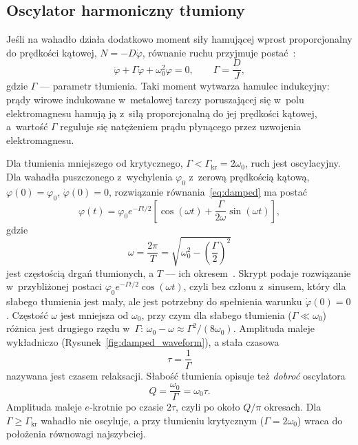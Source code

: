 \documentclass[12pt, a4paper]{article}
\begin{document}
\subsection{Oscylator harmoniczny tłumiony}

Jeśli na wahadło działa dodatkowo moment siły hamującej wprost proporcjonalny do
prędkości kątowej, $N = -D\dot{\varphi}$, równanie ruchu przyjmuje postać~\cite{skrypt}:
\begin{equation}
    \ddot{\varphi} + \Gamma\dot{\varphi} + \omega_0^2\varphi = 0,
    \qquad \Gamma = \frac{D}{J},
    \label{eq:damped}
\end{equation}
gdzie $\Gamma$ --- parametr tłumienia. Taki moment wytwarza hamulec indukcyjny:
prądy wirowe indukowane w~metalowej tarczy poruszającej się w~polu elektromagnesu
hamują ją z~siłą proporcjonalną do jej prędkości kątowej, a~wartość $\Gamma$ reguluje
się natężeniem prądu płynącego przez uzwojenia elektromagnesu.

Dla tłumienia mniejszego od krytycznego, $\Gamma < \Gamma_\text{kr} = 2\omega_0$,
ruch jest oscylacyjny. Dla wahadła puszczonego z~wychylenia $\varphi_0$ z~zerową
prędkością kątową, $\varphi(0) = \varphi_0$, $\dot{\varphi}(0) = 0$, rozwiązanie
równania~\eqref{eq:damped} ma postać
\begin{equation}
    \varphi(t) = \varphi_0 e^{-\Gamma t/2}\left[\cos(\omega t)
                 + \frac{\Gamma}{2\omega}\sin(\omega t)\right],
    \label{eq:damped_solution}
\end{equation}
gdzie
\begin{equation}
    \omega = \frac{2\pi}{T} = \sqrt{\omega_0^2 - \left(\frac{\Gamma}{2}\right)^2}
    \label{eq:omega_damped}
\end{equation}
jest częstością drgań tłumionych, a $T$ --- ich okresem~\cite{skrypt}. Skrypt podaje
rozwiązanie w~przybliżonej postaci $\varphi_0 e^{-\Gamma t/2}\cos(\omega t)$, czyli
bez członu z~sinusem, który dla słabego tłumienia jest mały, ale jest potrzebny do
spełnienia warunku $\dot{\varphi}(0) = 0$. Częstość $\omega$ jest mniejsza
od $\omega_0$, przy czym dla słabego tłumienia ($\Gamma \ll \omega_0$) różnica jest
drugiego rzędu w~$\Gamma$: $\omega_0 - \omega \approx \Gamma^2/(8\omega_0)$.
Amplituda maleje wykładniczo (Rysunek~\ref{fig:damped_waveform}), a stała czasowa
\begin{equation}
    \tau = \frac{1}{\Gamma}
    \label{eq:tau}
\end{equation}
nazywana jest czasem relaksacji. Słabość tłumienia opisuje też \emph{dobroć}
oscylatora
\begin{equation}
    Q = \frac{\omega_0}{\Gamma} = \omega_0\tau.
    \label{eq:Q}
\end{equation}
Amplituda maleje $e$-krotnie po czasie $2\tau$, czyli po około $Q/\pi$ okresach.
Dla $\Gamma \geq \Gamma_\text{kr}$ wahadło nie
oscyluje, a przy tłumieniu krytycznym ($\Gamma = 2\omega_0$) wraca do położenia
równowagi najszybciej.
\end{document}
